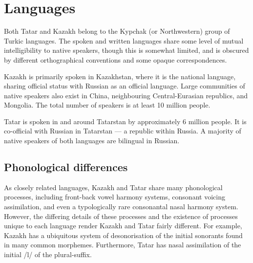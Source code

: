 \documentclass[a4paper,11pt]{article}
\begin{document}


\section{Languages}
\label{sec:lang}

Both Tatar and Kazakh belong to the Kypchak (or Northwestern) group of Turkic
languages.  The spoken and written languages share some level of mutual intelligibility to native 
speakers, though this is somewhat limited, and is obscured by different orthographical 
conventions and some opaque correspondences.

Kazakh is primarily spoken in Kazakhstan, where it is the national
language, sharing official status with Russian as an official language.
Large communities of native speakers also exist in China, neighbouring
Central-Eurasian republics, and Mongolia. The total number of speakers is at least 10 million people.

Tatar is spoken in and around Tatarstan by
approximately 6 million people. It is co-official with Russian in Tatarstan ---
a republic within Russia.  A majority of native speakers of both languages are bilingual in Russian. %

\subsection{Phonological differences}
As closely related languages, Kazakh and Tatar share many phonological processes, including 
front-back vowel harmony systems, consonant voicing assimilation, and even a typologically rare 
consonantal nasal harmony system.  However, the differing details of these processes and the existence of 
processes unique to each language render Kazakh and Tatar fairly different.  For example, Kazakh has a 
ubiquitous system of desonorisation of the initial sonorants found in many common morphemes.  Furthermore, Tatar 
has nasal assimilation of the initial /l/ of the plural-suffix.
\end{document}
